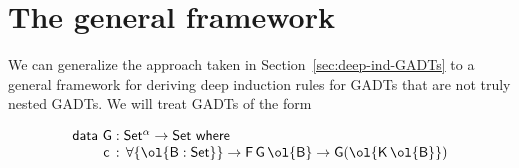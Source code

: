 \documentclass[sigplan,10pt,anonymous,review]{acmart}
\begin{document}
\vspace*{-0.05in}

\section{The general framework}\label{sec:framework}

We can generalize the approach taken in
Section~\ref{sec:deep-ind-GADTs} to a general framework for deriving
deep induction rules for GADTs that are not truly nested GADTs. We
will treat GADTs of the form

\vspace*{-0.05in}

\begin{equation}\label{eq:gadts}
\begin{array}{l}
  \mathsf{data\ G : Set^\alpha
    \to Set\ where}\\
\mathsf{\;\;\;\;\;\;\;\;c\, :\, \forall \{\ol{B : Set}\} \to F\,G\,\ol{B} \to G (\ol{K\,\ol{B}})}
\end{array}
\end{equation}
\end{document}
